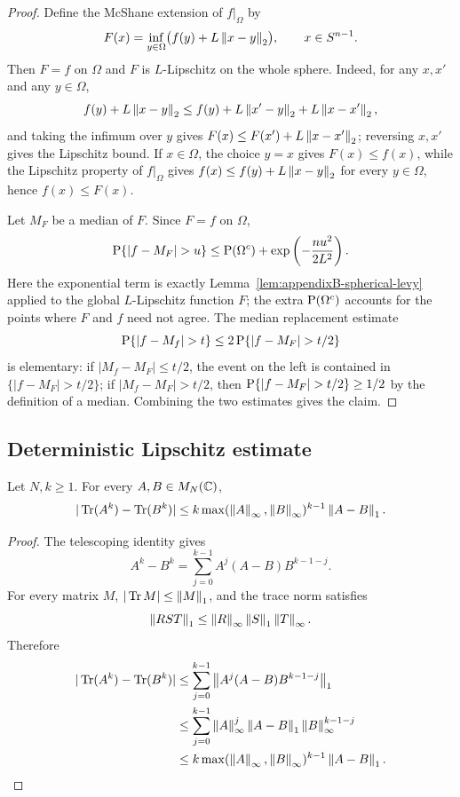 \begin{proof}
Define the McShane extension of \(f|_\Omega\) by
\[
  F(x)=\inf_{y\in\Omega}\bigl(f(y)+L\left\lVert x-y\right\rVert_2\bigr),
  \qquad x\in S^{n-1}.
\]
Then \(F=f\) on \(\Omega\) and \(F\) is \(L\)-Lipschitz on the whole sphere.
Indeed, for any \(x,x'\) and any \(y\in\Omega\),
\[
  f(y)+L\left\lVert x-y\right\rVert_2
  \le f(y)+L\left\lVert x'-y\right\rVert_2+L\left\lVert x-x'\right\rVert_2,
\]
and taking the infimum over \(y\) gives
\(F(x)\le F(x')+L\left\lVert x-x'\right\rVert_2\); reversing \(x,x'\) gives the Lipschitz
bound.  If \(x\in\Omega\), the choice \(y=x\) gives \(F(x)\le f(x)\), while
the Lipschitz property of \(f|_\Omega\) gives
\(f(x)\le f(y)+L\left\lVert x-y\right\rVert_2\) for every \(y\in\Omega\), hence
\(f(x)\le F(x)\).

Let \(M_F\) be a median of \(F\).  Since \(F=f\) on \(\Omega\),
\[
  \Prob\{|f-M_F|>u\}
  \le
  \Prob(\Omega^c)+
  \exp\left(-\frac{n u^2}{2L^2}\right).
\]
Here the exponential term is exactly Lemma~\ref{lem:appendixB-spherical-levy}
applied to the global \(L\)-Lipschitz function \(F\); the extra
\(\operatorname{P}(\Omega^c)\) accounts for the points where \(F\) and \(f\) need not
agree.
The median replacement estimate
\[
  \Prob\{|f-M_f|>t\}
  \le
  2\Prob\{|f-M_F|>t/2\}
\]
is elementary: if \(|M_f-M_F|\le t/2\), the event on the left is contained
in \(\{|f-M_F|>t/2\}\); if \(|M_f-M_F|>t/2\), then
\(\Prob\{|f-M_F|>t/2\}\ge1/2\) by the definition of a median.  Combining the
two estimates gives the claim.
\end{proof}

\subsection{Deterministic Lipschitz estimate}

\begin{lemma}
\label{lem:appendixB-trace-power-perturbation}
Let \(N,k\ge1\).  For every \(A,B\in M_N(\mathbb{C})\),
\[
  |\operatorname{Tr}(A^k)-\operatorname{Tr}(B^k)|
  \le
  k\max(\left\lVert A\right\rVert_\infty,\left\lVert B\right\rVert_\infty)^{k-1}\left\lVert A-B\right\rVert_1 .
\]
\end{lemma}

\begin{proof}
The telescoping identity gives
\[
  A^k-B^k
  =
  \sum_{j=0}^{k-1}A^j(A-B)B^{k-1-j}.
\]
For every matrix \(M\), \(|\operatorname{Tr} M|\le\left\lVert M\right\rVert_1\), and the trace norm satisfies
\[
  \left\lVert RST\right\rVert_1\le\left\lVert R\right\rVert_\infty\left\lVert S\right\rVert_1\left\lVert T\right\rVert_\infty .
\]
Therefore
\[
\begin{aligned}
|\operatorname{Tr}(A^k)-\operatorname{Tr}(B^k)|
&\le
\sum_{j=0}^{k-1}
\left\lVert A^j(A-B)B^{k-1-j}\right\rVert_1       \\
&\le
\sum_{j=0}^{k-1}
\left\lVert A\right\rVert_\infty^j\left\lVert A-B\right\rVert_1\left\lVert B\right\rVert_\infty^{k-1-j}                 \\
&\le
k\max(\left\lVert A\right\rVert_\infty,\left\lVert B\right\rVert_\infty)^{k-1}\left\lVert A-B\right\rVert_1 .
\end{aligned}
\]
\end{proof}

